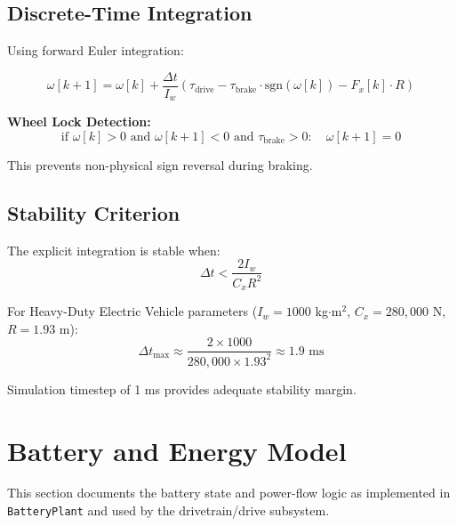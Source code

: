 \documentclass[11pt,a4paper]{article}
\begin{document}
\subsection{Discrete-Time Integration}

Using forward Euler integration:

\begin{equation}
\omega[k+1] = \omega[k] + \frac{\Delta t}{I_w} \left( \tau_{\text{drive}} - \tau_{\text{brake}} \cdot \text{sgn}(\omega[k]) - F_x[k] \cdot R \right)
\label{eq:wheel_integration}
\end{equation}

\textbf{Wheel Lock Detection:}
\begin{equation}
\text{if } \omega[k] > 0 \text{ and } \omega[k+1] < 0 \text{ and } \tau_{\text{brake}} > 0: \quad \omega[k+1] = 0
\end{equation}

This prevents non-physical sign reversal during braking.

\subsection{Stability Criterion}

The explicit integration is stable when:
\begin{equation}
\Delta t < \frac{2 I_w}{C_x R^2}
\end{equation}

For Heavy-Duty Electric Vehicle parameters ($I_w = 1000$ kg$\cdot$m$^2$, $C_x = 280{,}000$ N, $R = 1.93$ m):
\begin{equation}
\Delta t_{\max} \approx \frac{2 \times 1000}{280{,}000 \times 1.93^2} \approx 1.9 \text{ ms}
\end{equation}

Simulation timestep of 1 ms provides adequate stability margin.




\section{Battery and Energy Model}
\label{sec:battery}

This section documents the battery state and power-flow logic as implemented in \texttt{BatteryPlant} and used by the drivetrain/drive subsystem.
\end{document}
